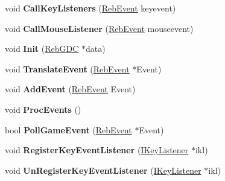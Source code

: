 \begin{DoxyCompactItemize}
\item 
void {\bfseries Call\+Key\+Listeners} (\hyperlink{union_reb_event}{Reb\+Event} keyevent)\hypertarget{class_reb_m_e_h_aa4686fff2d9a24aab9af1ffe28564b63}{}\label{class_reb_m_e_h_aa4686fff2d9a24aab9af1ffe28564b63}

\item 
void {\bfseries Call\+Mouse\+Listener} (\hyperlink{union_reb_event}{Reb\+Event} mouseevent)\hypertarget{class_reb_m_e_h_a2704f423f97da02393f5ba6783a7272e}{}\label{class_reb_m_e_h_a2704f423f97da02393f5ba6783a7272e}

\item 
void {\bfseries Init} (\hyperlink{class_reb_g_d_c}{Reb\+G\+DC} $\ast$data)\hypertarget{class_reb_m_e_h_a81e2c070c58981db2653d057c241859f}{}\label{class_reb_m_e_h_a81e2c070c58981db2653d057c241859f}

\item 
void {\bfseries Translate\+Event} (\hyperlink{union_reb_event}{Reb\+Event} $\ast$Event)\hypertarget{class_reb_m_e_h_a1e0fe5861fa9c0073e522e1fd4d2d707}{}\label{class_reb_m_e_h_a1e0fe5861fa9c0073e522e1fd4d2d707}

\item 
void {\bfseries Add\+Event} (\hyperlink{union_reb_event}{Reb\+Event} Event)\hypertarget{class_reb_m_e_h_aa1c8f52741ce170ef95ce4aff30330a5}{}\label{class_reb_m_e_h_aa1c8f52741ce170ef95ce4aff30330a5}

\item 
void {\bfseries Proc\+Events} ()\hypertarget{class_reb_m_e_h_a5dc7e6bf3849ed5ef41b9369c36679cd}{}\label{class_reb_m_e_h_a5dc7e6bf3849ed5ef41b9369c36679cd}

\item 
bool {\bfseries Poll\+Game\+Event} (\hyperlink{union_reb_event}{Reb\+Event} $\ast$Event)\hypertarget{class_reb_m_e_h_a505e1f8c0cb17ff0ecf5023114489250}{}\label{class_reb_m_e_h_a505e1f8c0cb17ff0ecf5023114489250}

\item 
void {\bfseries Register\+Key\+Event\+Listener} (\hyperlink{class_i_key_listener}{I\+Key\+Listener} $\ast$ikl)\hypertarget{class_reb_m_e_h_a46961942f4fb69f4fe3b4182ce3aba39}{}\label{class_reb_m_e_h_a46961942f4fb69f4fe3b4182ce3aba39}

\item 
void {\bfseries Un\+Register\+Key\+Event\+Listener} (\hyperlink{class_i_key_listener}{I\+Key\+Listener} $\ast$ikl)\hypertarget{class_reb_m_e_h_a767d0e359eab72f5acd064aaaf76af7b}{}\label{class_reb_m_e_h_a767d0e359eab72f5acd064aaaf76af7b}


\end{DoxyCompactItemize}
